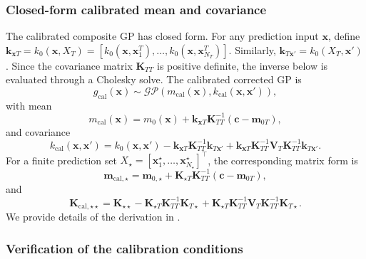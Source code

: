 \documentclass[a4paper,12pt]{article}
\newcommand{\x}{\mathbf{x}}
\begin{document}
\subsubsection{Closed-form calibrated mean and covariance}
\label{subsec:closed_form_calibration}

The calibrated composite GP has closed form. For any prediction input $\x$, define
$\mathbf{k}_{\x T}=k_0(\x,X_T)=\left[k_0(\x,\x_1^T),\ldots,k_0(\x,\x_{N_T}^T)\right]$.
Similarly, $\mathbf{k}_{T\x'}=k_0(X_T,\x')$.
Since the covariance matrix $\mathbf{K}_{TT}$ is positive definite, the inverse
below is evaluated through a Cholesky solve. The calibrated corrected GP is
\begin{equation*}
    g_{\mathrm{cal}}(\x)
    \sim
    \mathcal{GP}
    \left(
    m_{\mathrm{cal}}(\x),
    k_{\mathrm{cal}}(\x,\x')
    \right),
\end{equation*}
with mean
\begin{equation}
    m_{\mathrm{cal}}(\x)
    =
    m_0(\x)
    +
    \mathbf{k}_{\x T}
    \mathbf{K}_{TT}^{-1}
    \left(
    \mathbf{c}
    -
    \mathbf{m}_{0T}
    \right),
    \label{eq:calibrated_mean}
\end{equation}
and covariance
\[
    k_{\mathrm{cal}}(\x,\x')
    =
    k_0(\x,\x')
    -
    \mathbf{k}_{\x T}
    \mathbf{K}_{TT}^{-1}
    \mathbf{k}_{T\x'}
    +
    \mathbf{k}_{\x T}
    \mathbf{K}_{TT}^{-1}
    \mathbf{V}_T
    \mathbf{K}_{TT}^{-1}
    \mathbf{k}_{T\x'} .
\]
For a finite prediction set $X_\star=[\x_1^\star,\ldots,\x_{N_\star}^\star]^\top$,
the corresponding matrix form is
\begin{equation*}
    \mathbf{m}_{\mathrm{cal},\star}
    =
    \mathbf{m}_{0,\star}
    +
    \mathbf{K}_{\star T}
    \mathbf{K}_{TT}^{-1}
    \left(
    \mathbf{c}
    -
    \mathbf{m}_{0T}
    \right),
\end{equation*}
and
\[
    \mathbf{K}_{\mathrm{cal},\star\star}
    =
    \mathbf{K}_{\star\star}
    -
    \mathbf{K}_{\star T}
    \mathbf{K}_{TT}^{-1}
    \mathbf{K}_{T\star}
    +
    \mathbf{K}_{\star T}
    \mathbf{K}_{TT}^{-1}
    \mathbf{V}_T
    \mathbf{K}_{TT}^{-1}
    \mathbf{K}_{T\star}.
    \label{eq:calibrated_covariance_matrix}
\]
We provide details of the derivation in .

\subsubsection{Verification of the calibration conditions}
\label{subsec:calibration_verification}
\end{document}
